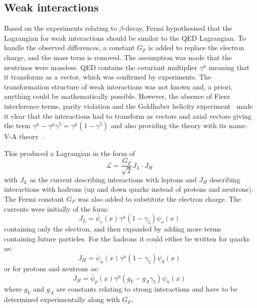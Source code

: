 
\subsection{Weak interactions}

Based on the experiments relating to $\beta$-decay, Fermi hypothesised that the Lagrangian for weak interactions should be similar to the QED Lagrangian. To handle the observed differences, a constant $G_F$ is added to replace the electron charge, and the mass term is removed. The assumption was made that the neutrinos were massless. QED contains the covariant multiplier $\gamma^\mu$ meaning that it transforms as a vector, which was confirmed by experiments. The transformation structure  of weak interactions was not known and, a priori, anything could be mathematically possible. However, the absence of Fierz interference terms, parity violation and the Goldhaber helicity experiment~\cite{1Helicity} made it clear that the interactions had to transform as vectors and axial vectors giving the term $\gamma^\mu - \gamma^\mu \gamma^5 =  \gamma^\mu (1- \gamma^5)$ and also providing the theory with its name: V-A theory~\cite{90Feynman}. 

This produced a Lagrangian in the form of 
\begin{equation}
\mathcal{L} = \frac{G_F}{\sqrt{2}}J_L \cdot J_H
\end{equation}
with $J_L$ as the current describing interactions with leptons and $J_H$ describing interactions with hadrons (up and down quarks instead of protons and neutrons). The Fermi constant $G_F$ was also added to substitute the electron charge. The currents were initially of the form:
\begin{equation}
J_L = \bar{\psi}_e(x)\gamma^\mu (1-\gamma_5) \psi_\nu(x)
\end{equation}
containing only the electron, and then expanded by adding more terms containing future particles. For the hadrons it could either be written for quarks as:
\begin{equation}
J_H = \bar{\psi}_u(x)\gamma^\mu (1-\gamma_5) \psi_d(x)
\end{equation}
or for protons and neutrons as:
\begin{equation}
J_H = \bar{\psi}_p(x)\gamma^\mu (g_V-g_A\gamma_5) \psi_n(x)
\end{equation}
where $g_V$ and $g_A$ are constants relating to strong interactions and have to be determined experimentally along with $G_F$.

